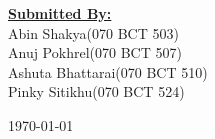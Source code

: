 \begin{titlepage}
\begin{center}
		
		\textbf {\underline{Submitted By:}}\\
			\textsf{Abin Shakya(070 BCT 503)\\
					Anuj Pokhrel(070 BCT 507)\\
					Ashuta Bhattarai(070 BCT 510)\\
					Pinky Sitikhu(070 BCT 524)}\\[0.1cm]
	\end{center}
	
	{\today}
		
\end{titlepage}

